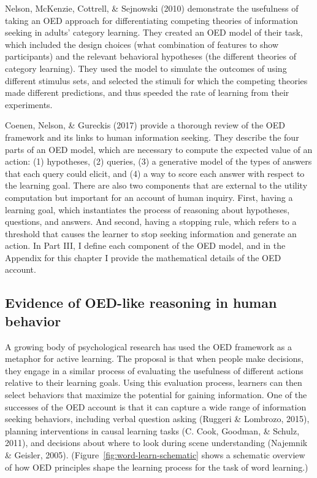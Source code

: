 \documentclass[oneside]{report}
\begin{document}
Nelson, McKenzie, Cottrell, \& Sejnowski (2010) demonstrate the
usefulness of taking an OED approach for differentiating competing
theories of information seeking in adults' category learning. They
created an OED model of their task, which included the design choices
(what combination of features to show participants) and the relevant
behavioral hypotheses (the different theories of category learning).
They used the model to simulate the outcomes of using different stimulus
sets, and selected the stimuli for which the competing theories made
different predictions, and thus speeded the rate of learning from their
experiments.

Coenen, Nelson, \& Gureckis (2017) provide a thorough review of the OED
framework and its links to human information seeking. They describe the
four parts of an OED model, which are necessary to compute the expected
value of an action: (1) hypotheses, (2) queries, (3) a generative model
of the types of answers that each query could elicit, and (4) a way to
score each answer with respect to the learning goal. There are also two
components that are external to the utility computation but important
for an account of human inquiry. First, having a learning goal, which
instantiates the process of reasoning about hypotheses, questions, and
answers. And second, having a stopping rule, which refers to a threshold
that causes the learner to stop seeking information and generate an
action. In Part III, I define each component of the OED model, and in
the Appendix for this chapter I provide the mathematical details of the
OED account.

\subsection{Evidence of OED-like reasoning in human
behavior}\label{evidence-of-oed-like-reasoning-in-human-behavior}

A growing body of psychological research has used the OED framework as a
metaphor for active learning. The proposal is that when people make
decisions, they engage in a similar process of evaluating the usefulness
of different actions relative to their learning goals. Using this
evaluation process, learners can then select behaviors that maximize the
potential for gaining information. One of the successes of the OED
account is that it can capture a wide range of information seeking
behaviors, including verbal question asking (Ruggeri \& Lombrozo, 2015),
planning interventions in causal learning tasks (C. Cook, Goodman, \&
Schulz, 2011), and decisions about where to look during scene
understanding (Najemnik \& Geisler, 2005).
(Figure~\ref{fig:word-learn-schematic} shows a schematic overview of how
OED principles shape the learning process for the task of word
learning.)
\end{document}
